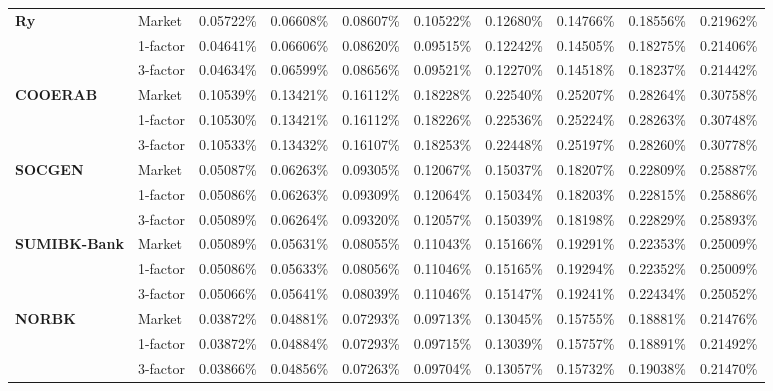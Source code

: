 \documentclass[12pt,a4paper]{article}
\theoremstyle{plain}
\numberwithin{equation}{section}
\begin{document}
\begin{table}[t]
{\begin{tabular}{|rl|cccccccc|}
    \midrule
    \multicolumn{1}{|l}{\textbf{Ry}} & Market & 0.05722\% & 0.06608\% & 0.08607\% & 0.10522\% & 0.12680\% & 0.14766\% & 0.18556\% & 0.21962\% \\
          & 1-factor & 0.04641\% & 0.06606\% & 0.08620\% & 0.09515\% & 0.12242\% & 0.14505\% & 0.18275\% & 0.21406\% \\
          & 3-factor & 0.04634\% & 0.06599\% & 0.08656\% & 0.09521\% & 0.12270\% & 0.14518\% & 0.18237\% & 0.21442\% \\
    \midrule
    \midrule
    \multicolumn{1}{|l}{\textbf{COOERAB}} & Market & 0.10539\% & 0.13421\% & 0.16112\% & 0.18228\% & 0.22540\% & 0.25207\% & 0.28264\% & 0.30758\% \\
          & 1-factor & 0.10530\% & 0.13421\% & 0.16112\% & 0.18226\% & 0.22536\% & 0.25224\% & 0.28263\% & 0.30748\% \\
          & 3-factor & 0.10533\% & 0.13432\% & 0.16107\% & 0.18253\% & 0.22448\% & 0.25197\% & 0.28260\% & 0.30778\% \\
    \midrule
    \midrule
    \multicolumn{1}{|l}{\textbf{SOCGEN}} & Market & 0.05087\% & 0.06263\% & 0.09305\% & 0.12067\% & 0.15037\% & 0.18207\% & 0.22809\% & 0.25887\% \\
\cmidrule{3-10}          & 1-factor & 0.05086\% & 0.06263\% & 0.09309\% & 0.12064\% & 0.15034\% & 0.18203\% & 0.22815\% & 0.25886\% \\
          & 3-factor & 0.05089\% & 0.06264\% & 0.09320\% & 0.12057\% & 0.15039\% & 0.18198\% & 0.22829\% & 0.25893\% \\
    \midrule
    \midrule
    \multicolumn{1}{|l}{\textbf{SUMIBK-Bank}} & Market & 0.05089\% & 0.05631\% & 0.08055\% & 0.11043\% & 0.15166\% & 0.19291\% & 0.22353\% & 0.25009\% \\
\cmidrule{3-10}          & 1-factor & 0.05086\% & 0.05633\% & 0.08056\% & 0.11046\% & 0.15165\% & 0.19294\% & 0.22352\% & 0.25009\% \\
          & 3-factor & 0.05066\% & 0.05641\% & 0.08039\% & 0.11046\% & 0.15147\% & 0.19241\% & 0.22434\% & 0.25052\% \\
    \midrule
    \midrule
    \multicolumn{1}{|l}{\textbf{NORBK}} & Market & 0.03872\% & 0.04881\% & 0.07293\% & 0.09713\% & 0.13045\% & 0.15755\% & 0.18881\% & 0.21476\% \\
\cmidrule{3-10}          & 1-factor & 0.03872\% & 0.04884\% & 0.07293\% & 0.09715\% & 0.13039\% & 0.15757\% & 0.18891\% & 0.21492\% \\
          & 3-factor & 0.03866\% & 0.04856\% & 0.07263\% & 0.09704\% & 0.13057\% & 0.15732\% & 0.19038\% & 0.21470\% \\

\end{tabular}}
\end{table}
\end{document}
